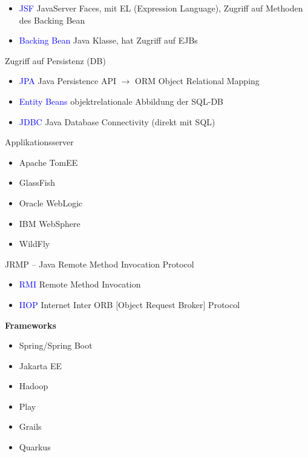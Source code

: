 \begin{itemize}
    \item \textcolor{blue}{JSF} JavaServer Faces, mit EL (Expression Language), Zugriff auf Methoden des Backing Bean
    \item \textcolor{blue}{Backing Bean} Java Klasse, hat Zugriff auf EJBs
\end{itemize}
\vspace{10pt}
Zugriff auf Persistenz (DB)

\begin{itemize}
    \item \textcolor{blue}{JPA} Java Persistence API $\rightarrow$ ORM Object Relational Mapping
    \item \textcolor{blue}{Entity Beans} objektrelationale Abbildung der SQL-DB
    \item \textcolor{blue}{JDBC} Java Database Connectivity (direkt mit SQL)
\end{itemize}
\vspace{10pt}
Applikationsserver

\begin{itemize}
    \item Apache TomEE
    \item GlassFish
    \item Oracle WebLogic
    \item IBM WebSphere
    \item WildFly
\end{itemize}
\vspace{10pt}
JRMP – Java Remote Method Invocation Protocol

\begin{itemize}
    \item \textcolor{blue}{RMI} Remote Method Invocation
    \item \textcolor{blue}{IIOP} Internet Inter ORB [Object Request Broker] Protocol
\end{itemize}

\textbf{Frameworks}

\begin{itemize}
    \item Spring/Spring Boot
    \item Jakarta EE
    \item Hadoop
    \item Play
    \item Grails
    \item Quarkus
\end{itemize}


